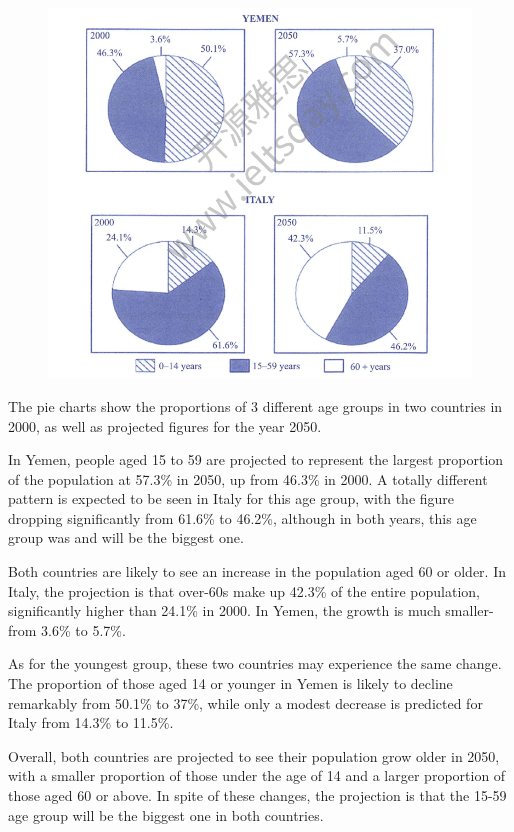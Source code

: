 \documentclass[conference]{IEEEtran}
\begin{document}
\begin{figure}[htbp]
    \centerline{\includegraphics[width=1.1\columnwidth]{images/Screenshot from 2022-12-04 22-22-15.png}}
\end{figure}

The pie charts show the proportions of 3 different age groups in two countries in 2000, 
as well as projected figures for the year 2050.

In Yemen, people aged 15 to 59 are projected to represent the largest proportion of the population at 57.3\% in 2050,
up from 46.3\% in 2000.
A totally different pattern is expected to be seen in Italy for this age group,
with the figure dropping significantly from 61.6\% to 46.2\%,
although in both years, this age group was and will be the biggest one.

Both countries are likely to see an increase in the population aged 60 or older.
In Italy, the projection is that over-60s make up 42.3\% of the entire population, 
significantly higher than 24.1\% in 2000.
In Yemen, the growth is much smaller-from 3.6\% to 5.7\%.

As for the youngest group, these two countries may experience the same change.
The proportion of those aged 14 or younger in Yemen is likely to decline remarkably from 50.1\% to 37\%,
while only a modest decrease is predicted for Italy from 14.3\% to 11.5\%.

Overall, both countries are projected to see their population grow older in 2050, 
with a smaller proportion of those under the age of 14 and a larger proportion of those aged 60 or above.
In spite of these changes, the projection is that the 15-59 age group will be the biggest one in both countries.
\end{document}
